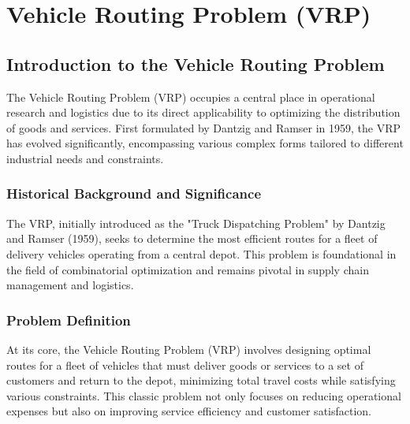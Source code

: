 \documentclass[
]{article}
\begin{document}
    \newpage

    \hypertarget{vehicle-routing-problem}{%


        \section{Vehicle Routing Problem (VRP)}\label{vehicle-routing-problem}}


    \hypertarget{introduction-to-the-vehicle-routing-problem}{%

        \subsection{Introduction to the Vehicle Routing Problem}\label{introduction-to-the-vehicle-routing-problem}}

    The Vehicle Routing Problem (VRP) occupies a central place in operational research and logistics due to its direct applicability to optimizing the distribution of goods and services. First formulated by Dantzig and Ramser in 1959, the VRP has evolved significantly, encompassing various complex forms tailored to different industrial needs and constraints.

    \subsubsection{Historical Background and Significance}\label{subsubsec:historical-background-and-significance}
    The VRP, initially introduced as the "Truck Dispatching Problem" by Dantzig and Ramser (1959), seeks to determine the most efficient routes for a fleet of delivery vehicles operating from a central depot. This problem is foundational in the field of combinatorial optimization and remains pivotal in supply chain management and logistics.

    \subsubsection{Problem Definition}\label{subsubsec:problem_definition}


    At its core, the Vehicle Routing Problem (VRP) involves designing optimal routes for a fleet of vehicles that must deliver goods or services to a set of customers and return to the depot, minimizing total travel costs while satisfying various constraints. This classic problem not only focuses on reducing operational expenses but also on improving service efficiency and customer satisfaction.
\end{document}
